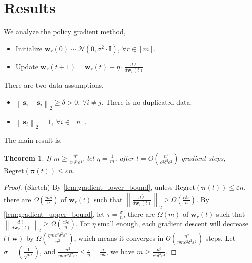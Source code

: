 \documentclass[10pt]{article}
\def\rvs{{\mathbf{s}}}
\def\rvw{{\mathbf{w}}}
\def\regret{{\text{Regret}}}
\newtheorem{thm}{Theorem}
\def\rvpi{{\boldsymbol{\pi}}}
\def\rmI{{\mathbf{I}}}
\def\gN{{\mathcal{N}}}
\begin{document}
\section{Results}

We analyze the policy gradient method,
\begin{itemize}
	\item Initialize $\rvw_r(0) \sim \gN(0, \sigma^2 \cdot \rmI)$, $\forall r \in [m]$.
	\item Update $\rvw_r(t+1) = \rvw_r(t) - \eta \cdot \frac{d\ell}{d \rvw_r(t)}$.
\end{itemize}

\noindent There are two data assumptions,
\begin{itemize}
	\item $\left\| \rvs_{i} -  \rvs_{j} \right\|_2 \ge \delta > 0 , \ \forall i \not= j$. There is no duplicated data.
	\item $\left\| \rvs_{i} \right\|_2 = 1, \ \forall i \in [n]$.
\end{itemize}

\noindent The main result is,
\begin{thm}
	If $m \ge \frac{n^6}{c^4 \delta^4 \varepsilon^4}$, let $\eta = \frac{1}{m}$, after $t = O\left( \frac{n^2}{ c^2\delta^2\varepsilon^2} \right)$ gradient steps, $\regret\left( \rvpi(t)\right) \le \varepsilon n$.
\end{thm}
\begin{proof}
(Sketch) By \cref{lem:gradient_lower_bound}, unless $\regret\left( \rvpi(t)\right) \le \varepsilon n$, there are $\Omega\left( \frac{m\delta}{n} \right)$ of $\rvw_r(t)$ such that $\left\| \frac{d\tilde{\ell}}{d \rvw_r(t)} \right\|_2 \ge \Omega\left( \frac{c\delta \varepsilon}{n} \right)$. By \cref{lem:gradient_upper_bound}, let $\tau = \frac{\sigma}{n}$, there are $\Omega\left( m \right)$ of $\rvw_r(t)$ such that $\left\| \frac{d\ell}{d \rvw_r(t)} \right\|_2 \ge \Omega\left( \frac{c\delta \varepsilon}{n} \right)$. For $\eta$ small enough, each gradient descent will decrease $l(\rvw)$ by $\Omega\left( \frac{\eta m c^2\delta^2\varepsilon^2}{n^2} \right)$, which means it converges in $O\left( \frac{n^2}{\eta m c^2\delta^2\varepsilon^2} \right)$ steps. Let $\sigma = \left( \frac{1}{\sqrt{m}} \right)$, and $\frac{n^2}{\eta m c^2\delta^2\varepsilon^2} \le \frac{\tau}{\eta} = \frac{\sigma}{\eta n}$, we have $m \ge \frac{n^6}{c^4 \delta^4 \varepsilon^4}$.
\end{proof}
\end{document}
